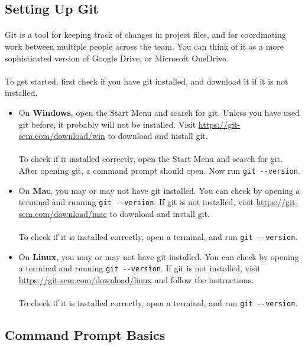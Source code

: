 \documentclass[11pt]{article}
\begin{document}
\subsection{Setting Up Git}
\paragraph{}
Git is a tool for keeping track of changes in project files, and for coordinating work between multiple people across the team. You can think of it as a more sophisticated version of Google Drive, or Microsoft OneDrive.
\paragraph{}
To get started, first check if you have git installed, and download it if it is not installed.
\begin{itemize}
\item On \textbf{Windows}, open the Start Menu and search for git. Unless you have used git before, it probably will not be installed. Visit \url{https://git-scm.com/download/win} to download and install git.\\\\
To check if it installed correctly, open the Start Menu and search for git. After opening git, a command prompt should open. Now run \lstinline{git --version}.
\item On \textbf{Mac}, you may or may not have git installed. You can check by opening a terminal and running \lstinline{git --version}. If git is not installed, visit \url{https://git-scm.com/download/mac} to download and install git.\\\\
To check if it is installed correctly, open a terminal, and run \lstinline{git --version}.
\item On \textbf{Linux}, you may or may not have git installed. You can check by opening a terminal and running \lstinline{git --version}. If git is not installed, visit \url{https://git-scm.com/download/linux} and follow the instructions.\\\\
To check if it is installed correctly, open a terminal, and run \lstinline{git --version}.
\end{itemize}
\subsection{Command Prompt Basics}
\end{document}
